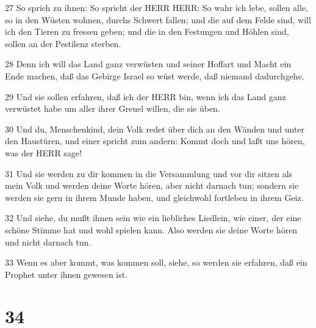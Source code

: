 \par 27 So sprich zu ihnen: So spricht der HERR HERR: So wahr ich lebe, sollen alle, so in den Wüsten wohnen, durchs Schwert fallen; und die auf dem Felde sind, will ich den Tieren zu fressen geben; und die in den Festungen und Höhlen sind, sollen an der Pestilenz sterben.
\par 28 Denn ich will das Land ganz verwüsten und seiner Hoffart und Macht ein Ende machen, daß das Gebirge Israel so wüst werde, daß niemand dadurchgehe.
\par 29 Und sie sollen erfahren, daß ich der HERR bin, wenn ich das Land ganz verwüstet habe um aller ihrer Greuel willen, die sie üben.
\par 30 Und du, Menschenkind, dein Volk redet über dich an den Wänden und unter den Haustüren, und einer spricht zum andern: Kommt doch und laßt uns hören, was der HERR sage!
\par 31 Und sie werden zu dir kommen in die Versammlung und vor dir sitzen als mein Volk und werden deine Worte hören, aber nicht darnach tun; sondern sie werden sie gern in ihrem Munde haben, und gleichwohl fortleben in ihrem Geiz.
\par 32 Und siehe, du mußt ihnen sein wie ein liebliches Liedlein, wie einer, der eine schöne Stimme hat und wohl spielen kann. Also werden sie deine Worte hören und nicht darnach tun.
\par 33 Wenn es aber kommt, was kommen soll, siehe, so werden sie erfahren, daß ein Prophet unter ihnen gewesen ist.

\chapter{34}

